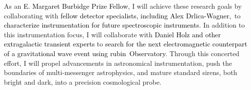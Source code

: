 \documentclass[11pt]{article}
\newcommand{\tcolor}{black}
\newcommand{\Rubin}{\ac{rubin}}
\newcommand{\Position}{\textcolor{\tcolor}{E. Margaret Burbidge Prize Fellow}}
\begin{document}






% 


As an \Position, I will achieve these research goals by collaborating with \textcolor{\tcolor}{fellow detector specialists, including Alex Drlica-Wagner,}\ to \textcolor{\tcolor}{characterize instrumentation for future spectroscopic instruments}. In addition to this instrumentation focus, I will collaborate with \textcolor{\tcolor}{Daniel Holz and other extragalactic transient experts} to \textcolor{\tcolor}{search for the next electromagnetic counterpart of a gravitational wave event using \Rubin\ Observatory}.
Through this concerted effort, I will propel advancements in astronomical instrumentation, push the boundaries of multi-messenger astrophysics, and mature standard sirens, both bright and dark, into a precision cosmological probe.

\end{document}
